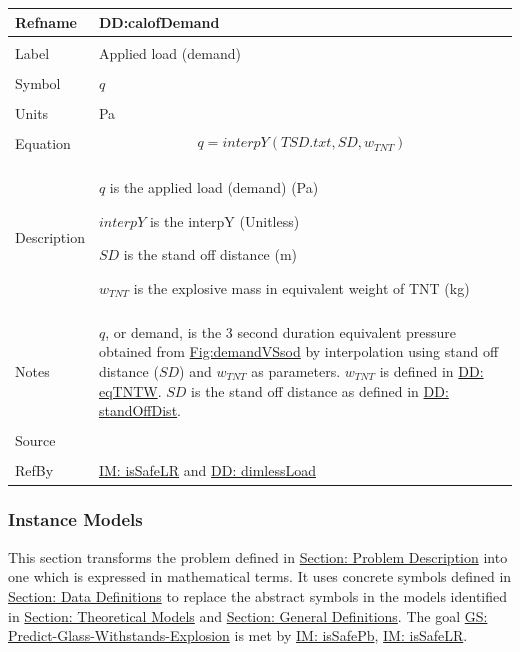 \documentclass[12pt]{article}
\begin{document}
\noindent \begin{minipage}{\textwidth}
\begin{tabular}{p{} p{}}
\toprule \textbf{Refname} & \textbf{DD:calofDemand}
\label{DD:calofDemand}
\\ \midrule \\
Label & Applied load (demand)
\\ \midrule \\
Symbol & $q$
\\ \midrule \\
Units & Pa
\\ \midrule \\
Equation & \begin{displaymath}
           q=interpY\left(TSD.txt,SD,{w_{TNT}}\right)
           \end{displaymath}
\\ \midrule \\
Description & \begin{symbDescription}
              \item{$q$ is the applied load (demand) (Pa)}
              \item{$interpY$ is the interpY (Unitless)}
              \item{$SD$ is the stand off distance (m)}
              \item{${w_{TNT}}$ is the explosive mass in equivalent weight of TNT (kg)}
              \end{symbDescription}
\\ \midrule \\
Notes & $q$, or demand, is the 3 second duration equivalent pressure obtained from \hyperref[Figure:demandVSsod]{Fig:demandVSsod} by interpolation using stand off distance ($SD$) and ${w_{TNT}}$ as parameters. ${w_{TNT}}$ is defined in \hyperref[DD:eqTNTW]{DD: eqTNTW}. $SD$ is the stand off distance as defined in \hyperref[DD:standOffDist]{DD: standOffDist}.
\\ \midrule \\
Source & \cite{astm2009}
\\ \midrule \\
RefBy & \hyperref[IM:isSafeLR]{IM: isSafeLR} and \hyperref[DD:dimlessLoad]{DD: dimlessLoad}
\\ \bottomrule \end{tabular}
\end{minipage}
\subsubsection{Instance Models}
\label{Sec:IMs}
This section transforms the problem defined in \hyperref[Sec:ProbDesc]{Section: Problem Description} into one which is expressed in mathematical terms. It uses concrete symbols defined in \hyperref[Sec:DDs]{Section: Data Definitions} to replace the abstract symbols in the models identified in \hyperref[Sec:TMs]{Section: Theoretical Models} and \hyperref[Sec:GDs]{Section: General Definitions}.
The goal \hyperref[willBreakGS]{GS: Predict-Glass-Withstands-Explosion} is met by \hyperref[IM:isSafePb]{IM: isSafePb}, \hyperref[IM:isSafeLR]{IM: isSafeLR}.
\par~
\end{document}
